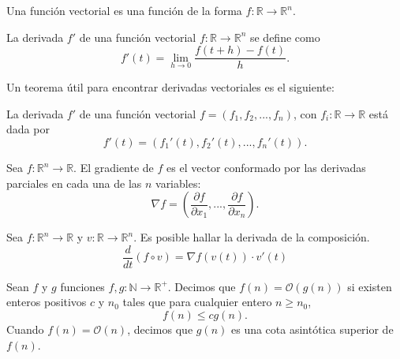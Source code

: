    \begin{definition}
        Una función vectorial es una función de la forma $f:\mathbb R \to \mathbb R^n$.
    \end{definition}

    \begin{definition}
        La derivada $f'$ de una función vectorial $f: \mathbb R \to \mathbb R^n$ se define como
        \begin{equation}
            f'(t) = \lim_{h\to 0} \frac{f(t+h)- f(t)}{h}.
        \end{equation}
    \end{definition}
    Un teorema útil para encontrar derivadas vectoriales es el siguiente:
    \begin{theorem}
        La derivada $f'$ de una función vectorial $f = (f_1, f_2, ..., f_n)$, con $f_i: \mathbb R \to \mathbb R$ está dada por
        \begin{equation}
            f'(t) = (f_1'(t), f_2'(t), ..., f_n'(t)).
        \end{equation}
    \end{theorem}
    \begin{definition}[Gradiente]
        Sea $f: \mathbb R^n \to \mathbb R$. El gradiente de $f$ es el vector conformado por las derivadas parciales en cada una de las $n$ variables:
        \begin{equation}
            \nabla f = \left(\frac{\partial f}{\partial x_1}, ..., \frac{\partial f}{\partial x_n}\right).
        \end{equation}
    \end{definition}
    \begin{proposition}
        Sea $f: \mathbb R^n \to \mathbb R$ y $v: \mathbb R \to \mathbb R^n$. Es posible hallar la derivada de la composición.
        \begin{equation}
            \frac{d}{dt}(f\circ v) = \nabla f(v(t)) \cdot  v'(t)
        \end{equation}
    \end{proposition}

    \begin{definition}
        Sean $f$ y $g$ funciones $f,g:\mathbb N \to \mathbb R^+$. Decimos que $f(n) = \mathcal O(g(n))$ si existen enteros positivos $c$ y $n_0$ tales que para cualquier entero $n\geq n_0$,
        \begin{equation}
            f(n) \leq cg(n).
        \end{equation}
        Cuando $f(n) = \mathcal O(n)$, decimos que $g(n)$ es una cota asintótica superior de $f(n)$.
    \end{definition}

